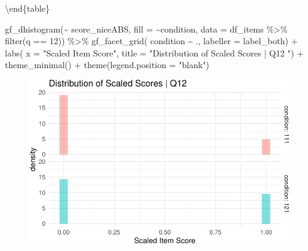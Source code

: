 \documentclass[
  letterpaper,
  DIV=11,
  numbers=noendperiod]{scrreprt}
\newenvironment{Shaded}{\begin{snugshade}}{\end{snugshade}}
\newcommand{\AttributeTok}[1]{\textcolor[rgb]{0.40,0.45,0.13}{#1}}
\newcommand{\DecValTok}[1]{\textcolor[rgb]{0.68,0.00,0.00}{#1}}
\newcommand{\FunctionTok}[1]{\textcolor[rgb]{0.28,0.35,0.67}{#1}}
\newcommand{\NormalTok}[1]{\textcolor[rgb]{0.00,0.23,0.31}{#1}}
\newcommand{\SpecialCharTok}[1]{\textcolor[rgb]{0.37,0.37,0.37}{#1}}
\newcommand{\StringTok}[1]{\textcolor[rgb]{0.13,0.47,0.30}{#1}}
\begin{document}
\textbackslash end\{table\}

\begin{Shaded}
\begin{Highlighting}[]
\FunctionTok{gf\_dhistogram}\NormalTok{(}\SpecialCharTok{\textasciitilde{}}\NormalTok{ score\_niceABS, }\AttributeTok{fill =} \SpecialCharTok{\textasciitilde{}}\NormalTok{condition, }\AttributeTok{data =}\NormalTok{ df\_items }\SpecialCharTok{\%\textgreater{}\%} \FunctionTok{filter}\NormalTok{(q }\SpecialCharTok{==} \DecValTok{12}\NormalTok{)) }\SpecialCharTok{\%\textgreater{}\%} 
  \FunctionTok{gf\_facet\_grid}\NormalTok{( condition }\SpecialCharTok{\textasciitilde{}}\NormalTok{ ., }\AttributeTok{labeller =}\NormalTok{ label\_both) }\SpecialCharTok{+} 
  \FunctionTok{labs}\NormalTok{( }\AttributeTok{x =} \StringTok{"Scaled Item Score"}\NormalTok{, }\AttributeTok{title =} \StringTok{"Distribution of Scaled Scores | Q12 "}\NormalTok{) }\SpecialCharTok{+} 
  \FunctionTok{theme\_minimal}\NormalTok{() }\SpecialCharTok{+} \FunctionTok{theme}\NormalTok{(}\AttributeTok{legend.position =} \StringTok{"blank"}\NormalTok{)}
\end{Highlighting}
\end{Shaded}

\begin{figure}[H]

{\centering \includegraphics{analysis/SGC3A/2_sgc3A_scoring_files/figure-pdf/Q12-distribution-1.pdf}

}

\end{figure}
\end{document}

